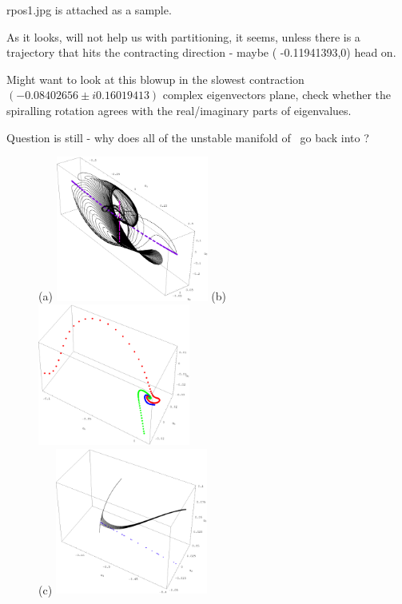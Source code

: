 rpos1.jpg is attached as a sample.

As it looks, will not help us with partitioning, it seems, unless there is
a trajectory that hits the contracting direction - maybe
( -0.11941393,0)
head on.

Might want to look at this blowup in
the  slowest contraction
$   ( -0.08402656 \pm i 0.16019413)$
complex eigenvectors plane, check whether the
spiralling rotation agrees with the real/imaginary parts of eigenvalues.

Question is still - why does all of the unstable manifold of
 \eqv\ go back
into
 \eqv ?

\begin{figure}[h]
\centering
(a) \includegraphics[width=5.0cm]{figs/L22-2w-UnsMan.eps}
\hspace{0.1in}
(b) \includegraphics[width=5.0cm]{figs/L22-2w-UnsMan-BlowUp.eps}
\\
(c) \includegraphics[width=5.0cm]{figs/L22-2w-3w-UnsMan.eps}

\end{figure}
